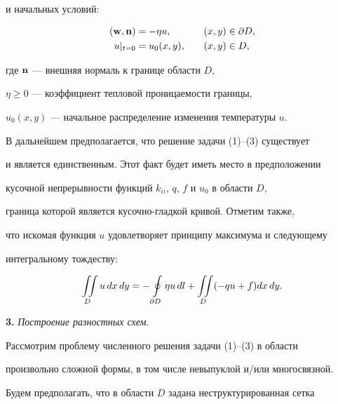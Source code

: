 и начальных условий:


\begin{alignat}{2}


\lEq{2}


({\bold w},{\bold n}) &= - \eta u, &\quad (x,y) &\in \partial D, \\


%


\lEq{3}


u|_{t=0} &= u_0(x,y), &\quad (x,y) &\in D,


\end{alignat}


где ${\bold n}$ --- внешняя нормаль к границе области $D$,


$\eta\ge 0$ --- коэффициент тепловой проницаемости границы,


$u_0(x,y)$ --- начальное распределение изменения температуры $u$.





В дальнейшем предполагается, что решение задачи (1)--(3) существует


и является единственным. Этот факт будет иметь место в предположении


кусочной непрерывности функций $k_{ii}$, $q$, $f$ и $u_0$ в области $D$,


граница которой является кусочно-гладкой кривой. Отметим также,


что искомая функция $u$ удовлетворяет принципу максимума и следующему


интегральному тождеству:


\begin{equation}


\lEq{4}


\iint\limits_D u\,dx\,dy = -\oint\limits_{\partial D} \eta u\,dl +


\iint\limits_D ( -qu + f) dx\,dy.


\end{equation}





{\bf 3.} {\it Построение разностных схем}.


Рассмотрим проблему численного решения задачи (1)--(3) в области


произвольно сложной формы, в том числе невыпуклой и/или многосвязной.





Будем предполагать, что в области $D$ задана неструктурированная сетка


